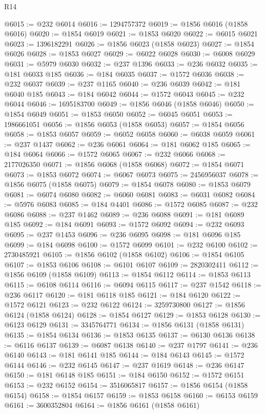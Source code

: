 \begin{lexlean}{R14}
\begin{coremodule}
@6015 := @232 @6014
@6016 := 1294757372
@6019 := @1856 @6016 (@1858 @6016)
@6020 := @1854 @6019
@6021 := @1853 @6020
@6022 := @6015 @6021
@6023 := 1396182291
@6026 := @1856 @6023 (@1858 @6023)
@6027 := @1854 @6026
@6028 := @1853 @6027
@6029 := @6022 @6028
@6030 := @6008 @6029
@6031 := @5979 @6030
@6032 := @237 @1396
@6033 := @236 @6032
@6035 := @181 @6033 @185
@6036 := @184 @6035
@6037 := @1572 @6036
@6038 := @232 @6037
@6039 := @237 @1165
@6040 := @236 @6039
@6042 := @181 @6040 @185
@6043 := @184 @6042
@6044 := @1572 @6043
@6045 := @232 @6044
@6046 := 1695183700
@6049 := @1856 @6046 (@1858 @6046)
@6050 := @1854 @6049
@6051 := @1853 @6050
@6052 := @6045 @6051
@6053 := 1986661051
@6056 := @1856 @6053 (@1858 @6053)
@6057 := @1854 @6056
@6058 := @1853 @6057
@6059 := @6052 @6058
@6060 := @6038 @6059
@6061 := @237 @1437
@6062 := @236 @6061
@6064 := @181 @6062 @185
@6065 := @184 @6064
@6066 := @1572 @6065
@6067 := @232 @6066
@6068 := 2177026350
@6071 := @1856 @6068 (@1858 @6068)
@6072 := @1854 @6071
@6073 := @1853 @6072
@6074 := @6067 @6073
@6075 := 2456956037
@6078 := @1856 @6075 (@1858 @6075)
@6079 := @1854 @6078
@6080 := @1853 @6079
@6081 := @6074 @6080
@6082 := @6060 @6081
@6083 := @6031 @6082
@6084 := @5976 @6083
@6085 := @184 @4401
@6086 := @1572 @6085
@6087 := @232 @6086
@6088 := @237 @1462
@6089 := @236 @6088
@6091 := @181 @6089 @185
@6092 := @184 @6091
@6093 := @1572 @6092
@6094 := @232 @6093
@6095 := @237 @1453
@6096 := @236 @6095
@6098 := @181 @6096 @185
@6099 := @184 @6098
@6100 := @1572 @6099
@6101 := @232 @6100
@6102 := 2730485921
@6105 := @1856 @6102 (@1858 @6102)
@6106 := @1854 @6105
@6107 := @1853 @6106
@6108 := @6101 @6107
@6109 := 2820302411
@6112 := @1856 @6109 (@1858 @6109)
@6113 := @1854 @6112
@6114 := @1853 @6113
@6115 := @6108 @6114
@6116 := @6094 @6115
@6117 := @237 @1542
@6118 := @236 @6117
@6120 := @181 @6118 @185
@6121 := @184 @6120
@6122 := @1572 @6121
@6123 := @232 @6122
@6124 := 3259730800
@6127 := @1856 @6124 (@1858 @6124)
@6128 := @1854 @6127
@6129 := @1853 @6128
@6130 := @6123 @6129
@6131 := 3345764771
@6134 := @1856 @6131 (@1858 @6131)
@6135 := @1854 @6134
@6136 := @1853 @6135
@6137 := @6130 @6136
@6138 := @6116 @6137
@6139 := @6087 @6138
@6140 := @237 @1797
@6141 := @236 @6140
@6143 := @181 @6141 @185
@6144 := @184 @6143
@6145 := @1572 @6144
@6146 := @232 @6145
@6147 := @237 @1619
@6148 := @236 @6147
@6150 := @181 @6148 @185
@6151 := @184 @6150
@6152 := @1572 @6151
@6153 := @232 @6152
@6154 := 3516065817
@6157 := @1856 @6154 (@1858 @6154)
@6158 := @1854 @6157
@6159 := @1853 @6158
@6160 := @6153 @6159
@6161 := 3600352804
@6164 := @1856 @6161 (@1858 @6161)

\end{coremodule}
\end{lexlean}
